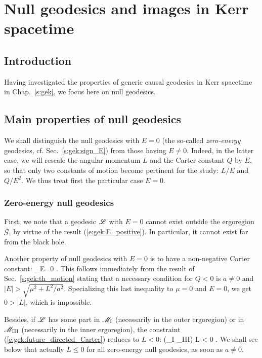 \chapter{Null geodesics and images in Kerr spacetime}
\label{s:gik}

\minitoc

\section{Introduction}

Having investigated the properties of generic causal geodesics
in Kerr spacetime in Chap.~\ref{s:gek}, we focus here on null
geodesics.


\section{Main properties of null geodesics} \label{s:gik:properties}

We shall distinguish the null geodesics with $E=0$ (the so-called \emph{zero-energy} geodesics,
cf. Sec.~\ref{s:gek:sign_E})
 from those having
$E \neq 0$. Indeed, in the latter case, we will rescale the angular momentum
$L$ and the Carter constant $Q$ by $E$, so that only two constants of motion become
pertinent for the study: $L/E$ and $Q/E^2$.
We thus treat first the particular case $E=0$.

\subsection{Zero-energy null geodesics} \label{s:gik:zero_energy}

First, we note that a geodesic $\mathscr{L}$ with $E=0$ cannot exist outside the ergoregion
$\mathscr{G}$, by virtue of the result (\ref{e:gek:E_positive}). In particular,
it cannot exist far from the black hole.

Another property of null geodesics with $E=0$ is to have a non-negative Carter constant:
\be \label{e:gik:Q_nonneg_E_zero}
   _{E=0} .
\ee
This follows immediately from the result of Sec.~\ref{s:gek:th_motion}
stating that a necessary condition for $Q < 0$ is $a\neq 0$ and
$|E| > \sqrt{\mu^2 + L^2/a^2}$. Specializing this last inequality to $\mu=0$
and $E=0$, we get $0 > |L|$, which is impossible.

Besides, if $\mathscr{L}$ has some part in $\mathscr{M}_{\rm I}$ (necessarily in the outer ergoregion)
or in $\mathscr{M}_{\rm III}$ (necessarily in the inner ergoregion),
the constraint (\ref{e:gek:future_directed_Carter})
reduces to $L<0$:
\be \label{e:gik:E_zero_L_neg_ergo}
    \Li \cap (\M_{\rm I} \cup \M_{\rm III}) \neq  \varnothing \quad \Longrightarrow \quad L < 0 .
\ee
We shall see below that actually $L \leq 0$ for all zero-energy null geodesics, as soon as $a\neq 0$.

